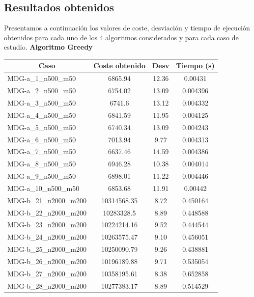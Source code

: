 \documentclass[11pt,a4paper]{article}
\begin{document}
	\subsection{Resultados obtenidos}
	
	Presentamos a continuación los valores de coste, desviación  y tiempo de ejecución obtenidos para cada uno de los 4 algoritmos considerados y para cada caso de estudio.
	\newpage
	\textbf{Algoritmo Greedy}
\begin{table}[H]
	\begin{center}
		\begin{tabular}{|l|c|c|c|} 
			\hline
			\multicolumn{1}{|c|}{\textbf{Caso}} & \textbf{Coste obtenido} & \textbf{Desv} & \textbf{Tiempo (s)} \\ \hline
			MDG-a\_1\_n500\_m50 & 6865.94 & 12.36 & 0.00431 \\ \hline
			MDG-a\_2\_n500\_m50 & 6754.02 & 13.09 & 0.004396 \\ \hline
			MDG-a\_3\_n500\_m50 & 6741.6 & 13.12 & 0.004332 \\ \hline
			MDG-a\_4\_n500\_m50 & 6841.59 & 11.95 & 0.004125 \\ \hline
			MDG-a\_5\_n500\_m50 & 6740.34 & 13.09 & 0.004243 \\ \hline
			MDG-a\_6\_n500\_m50 & 7013.94 & 9.77 & 0.004313 \\ \hline
			MDG-a\_7\_n500\_m50 & 6637.46 & 14.59 & 0.004386 \\ \hline
			MDG-a\_8\_n500\_m50 & 6946.28 & 10.38 & 0.004014 \\ \hline
			MDG-a\_9\_n500\_m50 & 6898.01 & 11.22 & 0.004446 \\ \hline
			MDG-a\_10\_n500\_m50 & 6853.68 & 11.91 & 0.00442 \\ \hline
			MDG-b\_21\_n2000\_m200 & 10314568.35 & 8.72 & 0.450164 \\ \hline
			MDG-b\_22\_n2000\_m200 & 10283328.5 & 8.89 & 0.448588 \\ \hline
			MDG-b\_23\_n2000\_m200 & 10224214.16 & 9.52 & 0.444544 \\ \hline
			MDG-b\_24\_n2000\_m200 & 10263575.47 & 9.10 & 0.456051 \\ \hline
			MDG-b\_25\_n2000\_m200 & 10250090.79 & 9.26 & 0.438881 \\ \hline
			MDG-b\_26\_n2000\_m200 & 10196189.88 & 9.71 & 0.535054 \\ \hline
			MDG-b\_27\_n2000\_m200 & 10358195.61 & 8.38 & 0.652858 \\ \hline
			MDG-b\_28\_n2000\_m200 & 10277383.17 & 8.89 & 0.514529 \\ \hline

\end{tabular}
\end{center}
\end{table}
\end{document}
